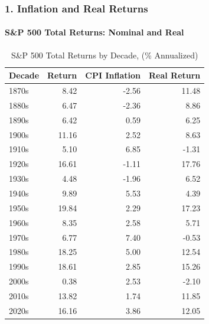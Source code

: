 \documentclass{beamer}
\begin{document}
{
\begin{frame}[t]
    \frametitle{1. Inflation and Real Returns}
    \framesubtitle{S\&P 500 Total Returns: Nominal and Real}
    
    \vspace{-1em}
    \scriptsize
        \begin{table}
        \caption{S\&P 500 Total Returns by Decade, (\% Annualized)}
        \begin{tabular}{lrrr}
        \toprule
        Decade & Return & CPI Inflation & Real Return \\
        \midrule
        1870s & 8.42 & -2.56 & 11.48 \\
        1880s & 6.47 & -2.36 & 8.86 \\
        1890s & 6.42 & 0.59 & 6.25 \\
        1900s & 11.16 & 2.52 & 8.63 \\
        1910s & 5.10 & 6.85 & -1.31 \\
        1920s & 16.61 & -1.11 & 17.76 \\
        1930s & 4.48 & -1.96 & 6.52 \\
        1940s & 9.89 & 5.53 & 4.39 \\
        1950s & 19.84 & 2.29 & 17.23 \\
        1960s & 8.35 & 2.58 & 5.71 \\
        1970s & 6.77 & 7.40 & -0.53 \\
        1980s & 18.25 & 5.00 & 12.54 \\
        1990s & 18.61 & 2.85 & 15.26 \\
        2000s & 0.38 & 2.53 & -2.10 \\
        2010s & 13.82 & 1.74 & 11.85 \\
        2020s & 16.16 & 3.86 & 12.05 \\
        \bottomrule
        \end{tabular}
        \end{table}


\end{frame}
}
\end{document}
